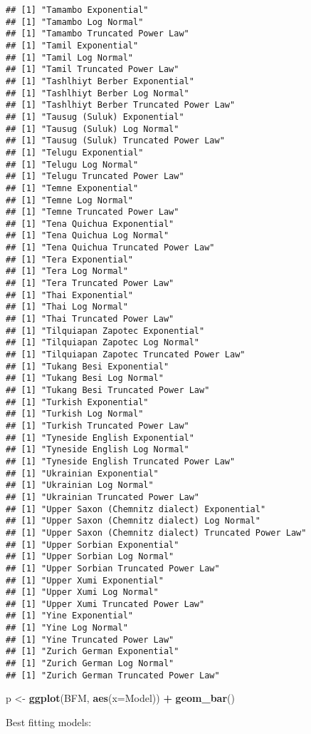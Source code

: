 \documentclass[]{article}
\newenvironment{Shaded}{\begin{snugshade}}{\end{snugshade}}
\newcommand{\DataTypeTok}[1]{\textcolor[rgb]{0.13,0.29,0.53}{#1}}
\newcommand{\KeywordTok}[1]{\textcolor[rgb]{0.13,0.29,0.53}{\textbf{#1}}}
\newcommand{\NormalTok}[1]{#1}
\newcommand{\OperatorTok}[1]{\textcolor[rgb]{0.81,0.36,0.00}{\textbf{#1}}}
\newcommand{\StringTok}[1]{\textcolor[rgb]{0.31,0.60,0.02}{#1}}
\begin{document}
\begin{verbatim}
## [1] "Tamambo Exponential"
## [1] "Tamambo Log Normal"
## [1] "Tamambo Truncated Power Law"
## [1] "Tamil Exponential"
## [1] "Tamil Log Normal"
## [1] "Tamil Truncated Power Law"
## [1] "Tashlhiyt Berber Exponential"
## [1] "Tashlhiyt Berber Log Normal"
## [1] "Tashlhiyt Berber Truncated Power Law"
## [1] "Tausug (Suluk) Exponential"
## [1] "Tausug (Suluk) Log Normal"
## [1] "Tausug (Suluk) Truncated Power Law"
## [1] "Telugu Exponential"
## [1] "Telugu Log Normal"
## [1] "Telugu Truncated Power Law"
## [1] "Temne Exponential"
## [1] "Temne Log Normal"
## [1] "Temne Truncated Power Law"
## [1] "Tena Quichua Exponential"
## [1] "Tena Quichua Log Normal"
## [1] "Tena Quichua Truncated Power Law"
## [1] "Tera Exponential"
## [1] "Tera Log Normal"
## [1] "Tera Truncated Power Law"
## [1] "Thai Exponential"
## [1] "Thai Log Normal"
## [1] "Thai Truncated Power Law"
## [1] "Tilquiapan Zapotec Exponential"
## [1] "Tilquiapan Zapotec Log Normal"
## [1] "Tilquiapan Zapotec Truncated Power Law"
## [1] "Tukang Besi Exponential"
## [1] "Tukang Besi Log Normal"
## [1] "Tukang Besi Truncated Power Law"
## [1] "Turkish Exponential"
## [1] "Turkish Log Normal"
## [1] "Turkish Truncated Power Law"
## [1] "Tyneside English Exponential"
## [1] "Tyneside English Log Normal"
## [1] "Tyneside English Truncated Power Law"
## [1] "Ukrainian Exponential"
## [1] "Ukrainian Log Normal"
## [1] "Ukrainian Truncated Power Law"
## [1] "Upper Saxon (Chemnitz dialect) Exponential"
## [1] "Upper Saxon (Chemnitz dialect) Log Normal"
## [1] "Upper Saxon (Chemnitz dialect) Truncated Power Law"
## [1] "Upper Sorbian Exponential"
## [1] "Upper Sorbian Log Normal"
## [1] "Upper Sorbian Truncated Power Law"
## [1] "Upper Xumi Exponential"
## [1] "Upper Xumi Log Normal"
## [1] "Upper Xumi Truncated Power Law"
## [1] "Yine Exponential"
## [1] "Yine Log Normal"
## [1] "Yine Truncated Power Law"
## [1] "Zurich German Exponential"
## [1] "Zurich German Log Normal"
## [1] "Zurich German Truncated Power Law"
\end{verbatim}

\begin{Shaded}
\begin{Highlighting}[]
\NormalTok{p <-}\StringTok{ }\KeywordTok{ggplot}\NormalTok{(BFM, }\KeywordTok{aes}\NormalTok{(}\DataTypeTok{x=}\NormalTok{Model)) }\OperatorTok{+}\StringTok{ }\KeywordTok{geom_bar}\NormalTok{()}
\end{Highlighting}
\end{Shaded}

Best fitting models:
\end{document}
